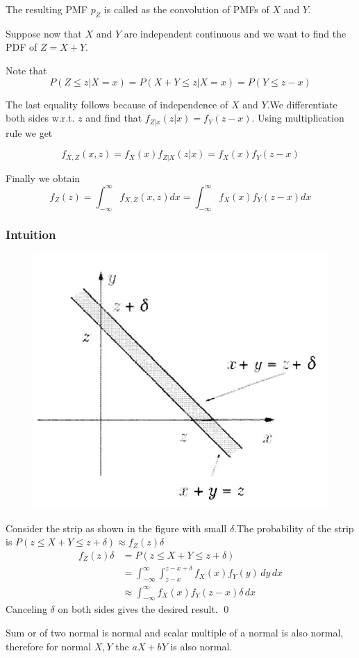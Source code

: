 The resulting PMF $p_Z$ is called as the convolution of PMFs of $X$ and $Y$.

Suppose now that $X$ and $Y$ are independent continuous \rv and we want to find the PDF of $Z=X+Y$.

Note that
\[P(Z\le z|X=x) = P(X+Y\le z|X=x) = P(Y\le z-x)\]

The last equality follows because of independence of $X$ and $Y$.We differentiate both sides w.r.t. $z$ and find that $f_{Z|x}(z|x)=f_Y(z-x)$. Using multiplication rule we get

\[f_{X,Z}(x,z)=f_X(x)f_{Z|X}(z|x)=f_X(x)f_Y(z-x)\]

Finally we obtain
\[f_Z(z)=\int_{-\infty}^{\infty}f_{X,Z}(x,z) dx = \int_{-\infty}^{\infty}f_X(x)f_Y(z-x) dx\]

\subsubsection{Intuition}
\begin{figure}[h]
    \center
    \includegraphics[width=.4\textwidth]{images/P_4_convolution.jpeg}
 \end{figure}

 Consider the strip as shown in the figure with small $\delta$.The probability of the strip is $P(z \le X+Y \le z+\delta) \approx f_Z(z) \delta$
 \begin{align*}
    f_Z(z) \delta &= P(z \le X+Y \le z+\delta) \\
    &= \int_{-\infty}^{\infty}\int_{z-x}^{z-x+\delta} f_X(x)f_Y(y) \, dy \, dx \\
    & \approx \int_{-\infty}^{\infty}f_X(x)f_Y(z-x) \delta \, dx
 \end{align*}
 Canceling $\delta$ on both sides gives the desired result. \qed
 \newline
 \begin{remark}
    Sum or of two normal \rv is normal and scalar multiple of a normal \rv is also normal, therefore for normal \rv $X, Y$ the \rv $aX+bY$ is also normal. 
 \end{remark}

